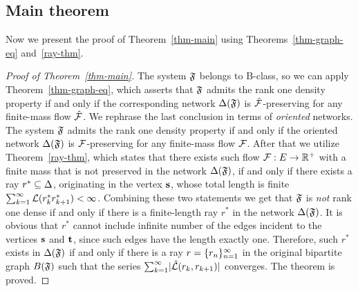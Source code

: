 \documentclass[12pt,oneside,a4paper]{amsart}
\begin{document}
      \medskip
      \subsection{Main theorem}
        Now we present the proof of Theorem~\ref{thm-main} using Theorems~\ref{thm-graph-eq} and~\ref{ray-thm}.
        \begin{proof}[Proof of Theorem~\ref{thm-main}]
          The system $\mathfrak{F}$ belongs to B-class, so we can apply Theorem~\ref{thm-graph-eq}, which asserts
            that $\mathfrak{F}$ admits the rank one density property if and only if
            the corresponding network $\Delta(\mathfrak{F})$ is $\mathcal{\hat{F}}$-preserving for any
            finite-mass flow $\mathcal{\hat{F}}$.
          We rephrase the last conclusion in terms of \emph{oriented} networks.
          The system $\mathfrak{F}$ admits the rank one density property if and only if
            the oriented network $\Delta(\mathfrak{F})$ is $\mathcal{F}$-preserving for any
            finite-mass flow $\mathcal{F}$.
          After that we utilize Theorem~\ref{ray-thm}, which states that there exists such
            flow $\mathcal{F}: E \to \mathbb{R}^{+}$ with a finite mass that is not preserved in
            the network $\Delta(\mathfrak{F})$, if and only if there exists a ray $r^{*} \subseteq \Delta$, originating in the vertex $\mathbf{s}$,
            whose total length is finite $\sum_{k=1}^\infty \mathcal{L}(r^{*}_k r^{*}_{k+1}) < \infty$.
          Combining these two statements we get that $\mathfrak{F}$ is \emph{not} rank one dense if and only if
            there is a finite-length ray $r^*$ in the network $\Delta(\mathfrak{F})$.
          It is obvious that $r^*$ cannot include infinite number of the edges incident to the vertices
            $\mathbf{s}$ and $\mathbf{t}$, since such edges have the length exactly one.
          Therefore, such $r^*$ exists in $\Delta(\mathfrak{F})$ if and only if there is a ray $r=\{{r}_n\}_{n=1}^\infty$ in the original bipartite graph $B(\mathfrak{F})$ such that
            the series $\sum_{k=1}^\infty\lvert\hat{\mathcal{L}}(r_k, r_{k+1})\rvert$ converges.
          The theorem is proved.
        \end{proof}
\end{document}
